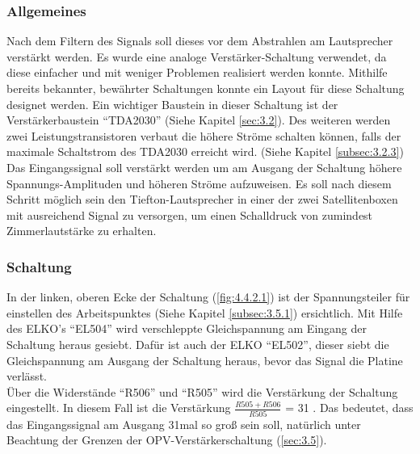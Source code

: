 \subsubsection{Allgemeines}\label{subsec:4.4.1}
Nach dem Filtern des Signals soll dieses vor dem Abstrahlen am Lautsprecher verstärkt werden.
Es wurde eine analoge Verstärker-Schaltung verwendet, da diese einfacher und mit weniger Problemen realisiert werden konnte.
Mithilfe bereits bekannter, bewährter Schaltungen konnte ein Layout für diese Schaltung designet werden.
Ein wichtiger Baustein in dieser Schaltung ist der Verstärkerbaustein \enquote{TDA2030} (Siehe Kapitel \ref{sec:3.2}).
Des weiteren werden zwei Leistungstransistoren verbaut die höhere Ströme schalten können, falls der maximale Schaltstrom des TDA2030 erreicht wird. (Siehe Kapitel \ref{subsec:3.2.3})
Das Eingangssignal soll verstärkt werden um am Ausgang der Schaltung höhere Spannungs-Amplituden und höheren Ströme aufzuweisen.
Es soll nach diesem Schritt möglich sein den Tiefton-Lautsprecher in einer der zwei Satellitenboxen mit ausreichend Signal zu versorgen, um einen Schalldruck von zumindest Zimmerlautstärke zu erhalten. 

\subsubsection{Schaltung}\label{subsec:4.4.2}
In der linken, oberen Ecke der Schaltung (\ref{fig:4.4.2.1}) ist der Spannungsteiler für einstellen des Arbeitspunktes (Siehe Kapitel \ref{subsec:3.5.1}) ersichtlich.
Mit Hilfe des ELKO's \enquote{EL504} wird verschleppte Gleichspannung am Eingang der Schaltung heraus gesiebt.
Dafür ist auch der ELKO \enquote{EL502}, dieser siebt die Gleichspannung am Ausgang der Schaltung heraus, bevor das Signal die Platine verlässt. \\
Über die Widerstände \enquote{R506} und \enquote{R505} wird die Verstärkung der Schaltung eingestellt.
In diesem Fall ist die Verstärkung $\frac{R505+R506}{R505}$ = 31 .
Das bedeutet, dass das Eingangssignal am Ausgang 31mal so groß sein soll, natürlich unter Beachtung der Grenzen der OPV-Verstärkerschaltung (\ref{sec:3.5}).

